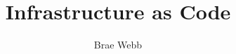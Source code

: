 \documentclass{csse4400}
\title{Infrastructure as Code}
\author{Brae Webb}
\date{\week{4}}
\begin{document}
\makecover





\end{document}
